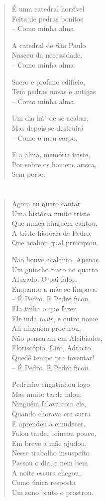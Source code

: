 {\begin{verse}
É uma catedral horrível\\
Feita de pedras bonitas\\
-- Como minha alma.

A catedral de São Paulo\\
Nasceu da necessidade.\\
-- Como minha alma.

Sacro e profano edifício,\\
Tem pedras novas e antigas\\
-- Como minha alma.

Um dia há"-de se acabar,\\
Mas depois se destruirá\\
-- Como o meu corpo.

E a alma, memória triste,\\
Por sobre os homens arisca,\\
Sem porto.
\end{verse}

\chapter*{}

\begin{verse}
Agora eu quero cantar\\
Uma história muito triste\\
Que nunca ninguém cantou,\\
A triste história de Pedro,\\
Que acabou qual principiou.

Não houve acalanto. Apenas\\
Um guincho fraco no quarto\\
Alugado. O pai falou,\\
Enquanto a mãe se limpava:\\
-- É Pedro. E Pedro ficou.\\
Ela tinha o que fazer,\\
Ele inda mais, e outro nome\\
Ali ninguém procurou,\\
Não pensaram em Alcibíades,\\
Floriscópio, Ciro, Adrasto,\\
Quedê tempo pra inventar!\\
-- É Pedro. E Pedro ficou.

Pedrinho engatinhou logo\\
Mas muito tarde falou;\\
Ninguém falava com ele,\\
Quando chorava era surra\\
E aprendeu a emudecer.\\
Falou tarde, brincou pouco,\\
Em breve a mãe ajudou.\\
Nesse trabalho insuspeito\\
Passou o dia, e nem bem\\
A noite escura chegou,\\
Como única resposta\\
Um sono bruto o prostrou.


\end{verse}}
